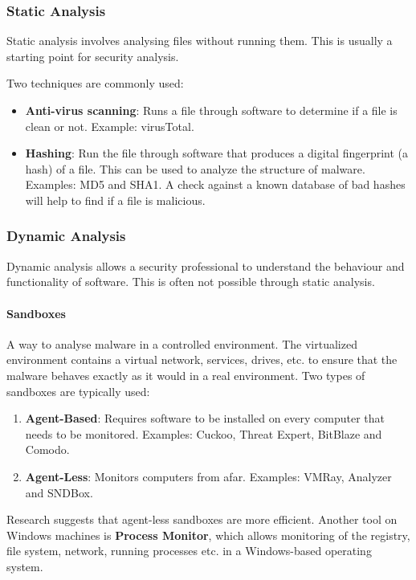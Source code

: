 \subsubsection{Static Analysis}

Static analysis involves analysing files without running them. This is usually a starting point for security analysis.

Two techniques are commonly used:
\begin{itemize}
    \item \textbf{Anti-virus scanning}: Runs a file through software to determine if a file is clean or not. Example: virusTotal.
    \item \textbf{Hashing}: Run the file through software that produces a digital fingerprint (a hash) of a file. This can be used to analyze the structure of malware. Examples: MD5 and SHA1. A check against a known database of bad hashes will help to find if a file is malicious.
\end{itemize}

\subsubsection{Dynamic Analysis}
Dynamic analysis allows a security professional to understand the behaviour and functionality of software. This is often not possible through static analysis.

\paragraph{Sandboxes} A way to analyse malware in a controlled environment. The virtualized environment contains a virtual network, services, drives, etc. to ensure that the malware behaves exactly as it would in a real environment. Two types of sandboxes are typically used:

\begin{enumerate}
    \item \textbf{Agent-Based}: Requires software to be installed on every computer that needs to be monitored. Examples: Cuckoo, Threat Expert, BitBlaze and Comodo.
    \item \textbf{Agent-Less}: Monitors computers from afar. Examples: VMRay, Analyzer and SNDBox.
\end{enumerate}

Research suggests that agent-less sandboxes are more efficient. Another tool on Windows machines is \textbf{Process Monitor}, which allows monitoring of the registry, file system, network, running processes etc. in a Windows-based operating system.

